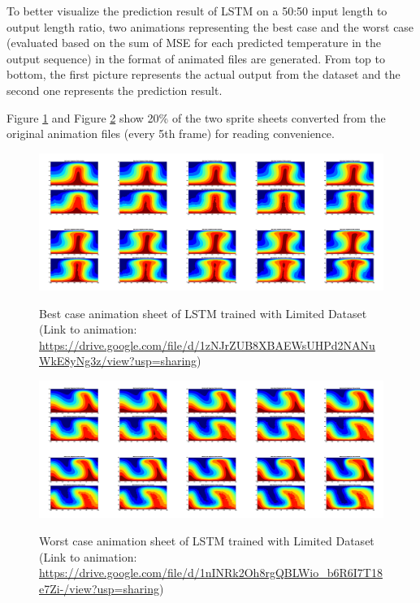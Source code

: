 To better visualize the prediction result of LSTM on a 50:50 input length to output length ratio, two animations representing the best case and the worst case (evaluated based on the sum of MSE for each predicted temperature in the output sequence) in the format of animated files are generated. From top to bottom, the first picture represents the actual output from the dataset and the second one represents the prediction result.

Figure \ref{figure:LSTM_limited_best_gif} and Figure \ref{figure:LSTM_limited_worst_gif} show 20\% of the two sprite sheets converted from the original animation files (every 5th frame) for reading convenience.

\begin{figure}[H]
    \centering
    \caption{Best case animation sheet of LSTM trained with Limited Dataset (Link to animation: \url{https://drive.google.com/file/d/1zNJrZUB8XBAEWsUHPd2NANuWkE8yNg3z/view?usp=sharing})}
    \includegraphics[scale=0.10]{figures/mantle_convection_images/limited_dataset/LSTM_Best_GIF_sheet.png}
    \label{figure:LSTM_limited_best_gif}
\end{figure}



\begin{figure}[H]
    \centering
    \caption{Worst case animation sheet of LSTM trained with Limited Dataset (Link to animation: 
    \url{https://drive.google.com/file/d/1nINRk2Oh8rgQBLWio_b6R6I7T18e7Zi-/view?usp=sharing})}
    \includegraphics[scale=0.10]{figures/mantle_convection_images/limited_dataset/LSTM_Worst_GIF_sheet.png}
    \label{figure:LSTM_limited_worst_gif}
\end{figure}

